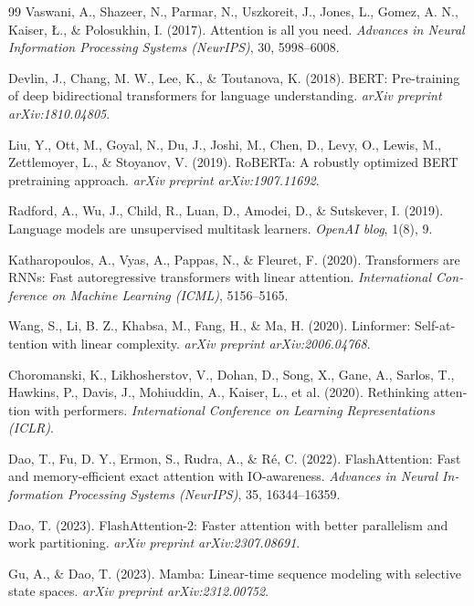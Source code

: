 \documentclass[12pt,a4paper]{report}
\theoremstyle{definition}
\begin{document}
\begin{latin}
\begin{thebibliography}{99}
Vaswani, A., Shazeer, N., Parmar, N., Uszkoreit, J., Jones, L., Gomez, A. N., Kaiser, {\L}., \& Polosukhin, I. (2017).
Attention is all you need.
\textit{Advances in Neural Information Processing Systems (NeurIPS)}, 30, 5998--6008.

Devlin, J., Chang, M. W., Lee, K., \& Toutanova, K. (2018).
BERT: Pre-training of deep bidirectional transformers for language understanding.
\textit{arXiv preprint arXiv:1810.04805}.

Liu, Y., Ott, M., Goyal, N., Du, J., Joshi, M., Chen, D., Levy, O., Lewis, M., Zettlemoyer, L., \& Stoyanov, V. (2019).
RoBERTa: A robustly optimized BERT pretraining approach.
\textit{arXiv preprint arXiv:1907.11692}.

Radford, A., Wu, J., Child, R., Luan, D., Amodei, D., \& Sutskever, I. (2019).
Language models are unsupervised multitask learners.
\textit{OpenAI blog}, 1(8), 9.

Katharopoulos, A., Vyas, A., Pappas, N., \& Fleuret, F. (2020).
Transformers are RNNs: Fast autoregressive transformers with linear attention.
\textit{International Conference on Machine Learning (ICML)}, 5156--5165.

Wang, S., Li, B. Z., Khabsa, M., Fang, H., \& Ma, H. (2020).
Linformer: Self-attention with linear complexity.
\textit{arXiv preprint arXiv:2006.04768}.

Choromanski, K., Likhosherstov, V., Dohan, D., Song, X., Gane, A., Sarlos, T., Hawkins, P., Davis, J., Mohiuddin, A., Kaiser, L., et al. (2020).
Rethinking attention with performers.
\textit{International Conference on Learning Representations (ICLR)}.

Dao, T., Fu, D. Y., Ermon, S., Rudra, A., \& R{\'e}, C. (2022).
FlashAttention: Fast and memory-efficient exact attention with IO-awareness.
\textit{Advances in Neural Information Processing Systems (NeurIPS)}, 35, 16344--16359.

Dao, T. (2023).
FlashAttention-2: Faster attention with better parallelism and work partitioning.
\textit{arXiv preprint arXiv:2307.08691}.

Gu, A., \& Dao, T. (2023).
Mamba: Linear-time sequence modeling with selective state spaces.
\textit{arXiv preprint arXiv:2312.00752}.


\end{thebibliography}
\end{latin}
\end{document}
